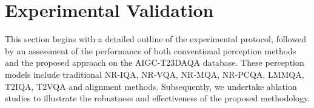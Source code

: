 \section{Experimental Validation}
This section begins with a detailed outline of the experimental protocol, followed by an assessment of the performance of both conventional perception methods and the proposed approach on the AIGC-T23DAQA database. These perception models include traditional NR-IQA, NR-VQA, NR-MQA, NR-PCQA, LMMQA, T2IQA, T2VQA and alignment methods. Subsequently, we undertake ablation studies to illustrate the robustness and effectiveness of the proposed methodology.

\begin{table*}[tbph]

\caption{Performance results of learning-based metrics on our AIGC-T23DAQA database. [Key: {\bf\textcolor{red}{Best}, \bf\textcolor{blue}{Second Best}}]}
\label{tab:training}
\centering
{}
\end{table*}

